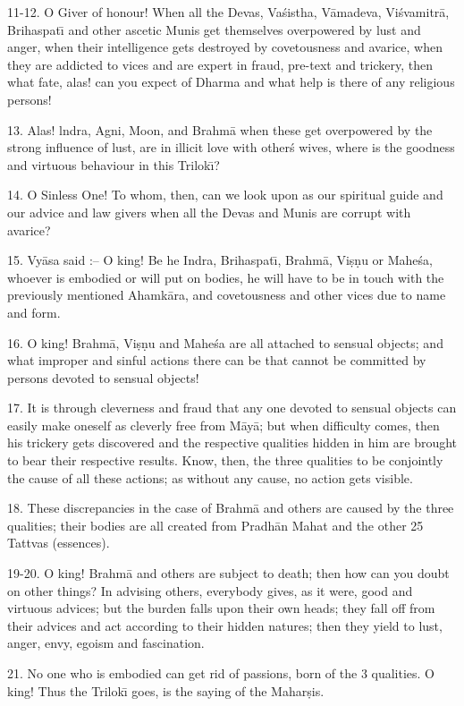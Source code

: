 11-12. O Giver of honour! When all the Devas, Va\'sistha, V\=amadeva, Vi\'svamitr\=a, Brihaspat\={\i} and other ascetic Munis get themselves overpowered by lust and anger, when their intelligence gets destroyed by covetousness and avarice, when they are addicted to vices and are expert in fraud, pre-text and trickery, then what fate, alas! can you expect of Dharma and what help is there of any religious persons!

13. Alas! lndra, Agni, Moon, and Brahm\=a when these get overpowered by the strong influence of lust, are in illicit love with other\'s wives, where is the goodness and virtuous behaviour in this Trilok\={\i}?

14. O Sinless One! To whom, then, can we look upon as our spiritual guide and our advice and law givers when all the Devas and Munis are corrupt with avarice?

15. Vy\=asa said :-- O king! Be he Indra, Brihaspat\={\i}, Brahm\=a, Vi\d{s}\d{n}u or Mahe\'sa, whoever is embodied or will put on bodies, he will have to be in touch with the previously mentioned Ahamk\=ara, and covetousness and other vices due to name and form.

16. O king! Brahm\=a, Vi\d{s}\d{n}u and Mahe\'sa are all attached to sensual objects; and what improper and sinful actions there can be that cannot be committed by persons devoted to sensual objects!

17. It is through cleverness and fraud that any one devoted to sensual objects can easily make oneself as cleverly free from M\=ay\=a; but when difficulty comes, then his trickery gets discovered and the respective qualities hidden in him are brought to bear their respective results. Know, then, the three qualities to be conjointly the cause of all these actions; as without any cause, no action gets visible.

18. These discrepancies in the case of Brahm\=a and others are caused by the three qualities; their bodies are all created from Pradh\=an Mahat and the other 25 Tattvas (essences).

19-20. O king! Brahm\=a and others are subject to death; then how can you doubt on other things? In advising others, everybody gives, as it were, good and virtuous advices; but the burden falls upon their own heads; they fall off from their advices and act according to their hidden natures; then they yield to lust, anger, envy, egoism and fascination.

21. No one who is embodied can get rid of passions, born of the 3 qualities. O king! Thus the Trilok\={\i} goes, is the saying of the Mahar\d{s}is.

